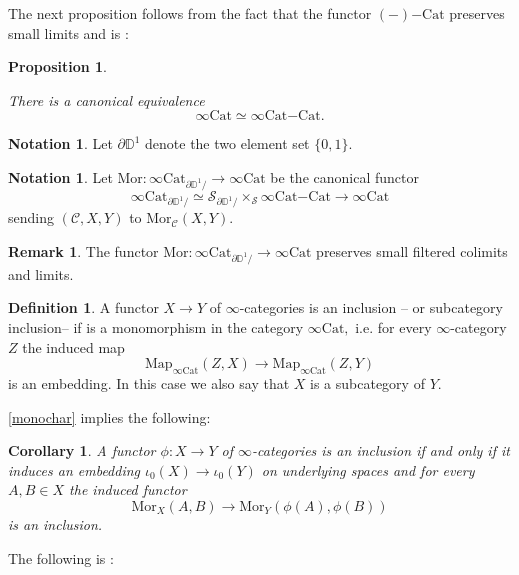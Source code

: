 \documentclass[10pt,oneside]{article}
\numberwithin{equation}{section} %
\numberwithin{figure}{section} %
\theoremstyle{plain}
\newtheorem{proposition}[theorem]{Proposition}
\newtheorem{corollary}[theorem]{Corollary}
\theoremstyle{definition}
\newtheorem{definition}[theorem]{Definition}
\newtheorem{notation}[theorem]{Notation}
\newtheorem{remark}[theorem]{Remark}
\newcommand{\bD}{{\mathbb D}}
\newcommand{\mC}{{\mathcal C}}
\newcommand{\mS}{{\mathcal S}}
\newcommand{\X}{X}
\newcommand{\Y}{Y}
\newcommand{\Cat}{\mathrm{Cat}}
\newcommand{\Map}{{\mathrm{Map}}}
\newcommand{\Mor}{{\mathrm{Mor}}}
\begin{document}
The next proposition follows from the fact that the functor ${(-)\mathrm{-}\Cat}$ preserves small limits and is \cite[Proposition 2.4.4.]{GepnerHeine2026}:

\begin{proposition}\label{fix}
	
There is a canonical equivalence
$$ \infty\Cat \simeq {\infty\Cat}\mathrm{-}\Cat. $$
	
\end{proposition}

\begin{notation}
Let $\partial\bD^1$ denote the two element set $\{0,1\}$.
\end{notation}


\begin{notation}
Let $\Mor: \infty\Cat_{\partial\bD^1/} \to \infty\Cat$
be the canonical functor $$\infty\Cat_{\partial\bD^1/} \simeq \mS_{\partial\bD^1/}\times_\mS {\infty\Cat}\mathrm{-}\Cat \to \infty\Cat $$
sending $(\mC,\X,\Y)$ to $\Mor_\mC(\X,\Y).$
\end{notation}

\begin{remark}\label{homfil}
The functor $\Mor: \infty\Cat_{\partial\bD^1/} \to \infty\Cat$
preserves small filtered colimits and limits.

 	
\end{remark}

\begin{definition}

A functor $X \to Y$ of $\infty$-categories is an inclusion -- or subcategory inclusion-- if is a monomorphism in the category $\infty\Cat,$ i.e. for every $\infty$-category $Z$ the induced map $$\Map_{\infty\Cat}(Z,X) \to \Map_{\infty\Cat}(Z,Y)$$ is an embedding.
In this case we also say that $X$ is a subcategory of $Y$.
 
\end{definition}

\cref{monochar} implies the following:

\begin{corollary}

A functor $\phi: X \to Y$ of $\infty$-categories is an inclusion if and only if it induces an embedding $\iota_0(X) \to \iota_0(Y)$ on underlying spaces and for every $A,B \in X$ the induced functor
$$\Mor_X(A, B) \to \Mor_Y(\phi(A), \phi(B))$$ is an inclusion.

\end{corollary}

The following is \cite[Proposition 2.5.9.]{GepnerHeine2026}:
\end{document}

